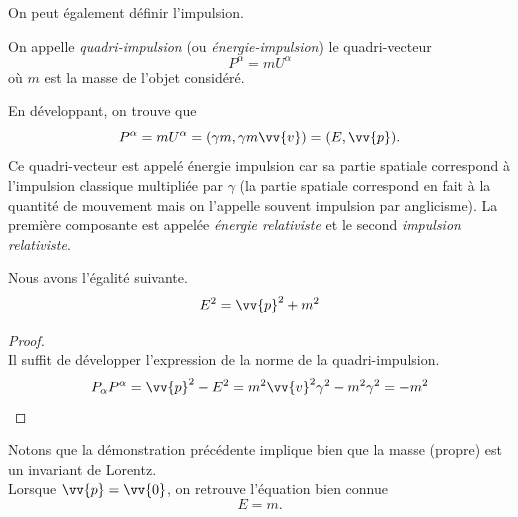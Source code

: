 \documentclass[a4paper,11pt]{report}
\begin{document}
            On peut également définir l'impulsion.
            \begin{definition}
                On appelle \textit{quadri-impulsion} (ou \textit{énergie-impulsion}) le quadri-vecteur 
                \begin{equation}
                    P^\alpha = mU^\alpha
                \end{equation}
                où $m$ est la masse de l'objet considéré.
            \end{definition}
            En développant, on trouve que
            \begin{equation}
                P^\alpha = m U^\alpha = (\gamma m,\gamma m\vv{v}) = (E,\vv{p}).
            \end{equation}
            Ce quadri-vecteur est appelé énergie impulsion car sa partie spatiale correspond à l'impulsion classique multipliée par $\gamma$ (la partie spatiale correspond en fait à la quantité de mouvement mais on l'appelle souvent impulsion par anglicisme). La première composante est appelée \textit{énergie relativiste} et le second \textit{impulsion relativiste}.
            
            \begin{prop}\begin{leftbar}
                Nous avons l'égalité suivante.
                \begin{equation}
                    E^2 = \vv{p}^2 + m^2
                \end{equation}
            \end{leftbar}\end{prop}
            \begin{proof}
            ${}$\\
                Il suffit de développer l'expression de la norme de la quadri-impulsion.
                \begin{equation}
                P_\alpha P^\alpha = \vv{p}^2-E^2 = m^2\vv{v}^2\gamma^2-m^2\gamma^2 = -m^2
            \end{equation}
            \end{proof}
            
            Notons que la démonstration précédente implique bien que la masse (propre) est un invariant de Lorentz.\\
            
            Lorsque $\vv{p} = \vv{0}$, on retrouve l'équation bien connue
            \begin{equation}
                E = m.
            \end{equation}
            
\end{document}
